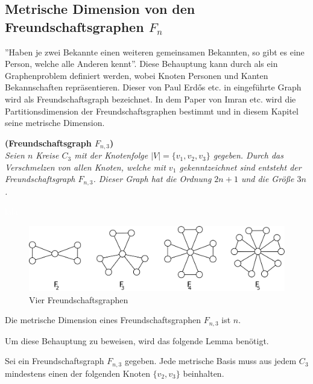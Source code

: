 \subsection{Metrische Dimension von den Freundschaftsgraphen $F_{n}$}
''Haben je zwei Bekannte einen weiteren gemeinsamen Bekannten, so gibt es eine Person, welche alle Anderen kennt''. Diese Behauptung kann durch als ein Graphenproblem definiert werden, wobei Knoten Personen und Kanten Bekannschaften repräsentieren.  Dieser von Paul Erdős etc. in \cite{Erdos} eingeführte Graph wird als Freundschaftsgraph bezeichnet. In dem Paper von Imran etc. wird die Partitionsdimension der Freundschaftsgraphen bestimmt und in diesem Kapitel seine metrische Dimension.
\begin{defi}{\textbf{(Freundschaftsgraph $F_{n,3}$)}}\\
\emph{Seien $n$ Kreise $C_3$ mit der Knotenfolge $|V|=\{v_1,v_2,v_3\}$ gegeben. Durch das Verschmelzen von allen Knoten, welche mit $v_1$ gekenntzeichnet sind entsteht der Freundschaftsgraph $F_{n,3}$. Dieser Graph hat die Ordnung $2n+1$ und die Größe $3n$.}
\end{defi}
\begin{bsp}\textcolor{white}{lala}
\begin{figure}[h!]
\centering
 		 \includegraphics[width=428pt]{bilder/freunschaftsgraph.pdf}
   \caption{Vier Freundschaftsgraphen}
   \label{bild:fg}
\end{figure}
\end{bsp}
\begin{lem}
\label{Freundschaftsgraphen}
Die metrische Dimension eines Freundschaftsgraphen $F_{n,3}$ ist $n$.
\end{lem}
\vspace{-1mm}
Um diese Behauptung zu beweisen, wird das folgende Lemma benötigt. 
\begin{lem}
\label{mindfreundschaftsgraph}
Sei ein Freundschaftsgraph $F_{n,3}$ gegeben. Jede metrische Basis muss aus jedem $C_3$ mindestens einen der folgenden Knoten $\{v_{2},v_{3}\}$ beinhalten.
\end{lem}
\newpage
